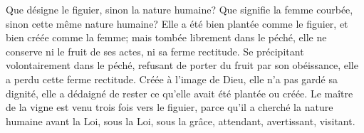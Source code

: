 Que désigne le figuier, sinon la nature humaine?
Que signifie la femme courbée, sinon cette même nature humaine?
Elle a été bien plantée comme le figuier, et bien créée comme la femme;
	mais tombée librement dans le péché,
		elle ne conserve ni le fruit de ses actes, ni sa ferme rectitude.
Se précipitant volontairement dans le péché,
	refusant de porter du fruit par son obéissance,
	elle a perdu cette ferme rectitude.
Créée à l'image de Dieu, elle n'a pas gardé sa dignité,
	elle a dédaigné de rester ce qu'elle avait été plantée ou créée.
Le maître de la vigne est venu trois fois vers le figuier,
	parce qu'il a cherché la nature humaine
		avant la Loi, sous la Loi, sous la grâce,
	attendant, avertissant, visitant.
